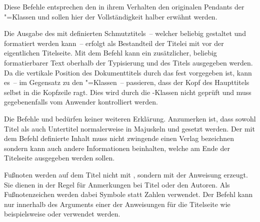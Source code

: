 \begin{Declaration}{}
\begin{Declaration}{}
\begin{Declaration}{}
\begin{Declaration}{}
\begin{Declaration}{}
\begin{Declaration}{}
\begin{Declaration}{}
\begin{Declaration}{}
\begin{Declaration}{}
\printdeclarationlist%
%
%
Diese Befehle entsprechen den in ihrem Verhalten den originalen Pendants der 
\KOMAScript"=Klassen{} und sollen hier der Vollständigkeit halber erwähnt 
werden.

Die Ausgabe des mit  definierten Schmutztitels~-- welcher 
beliebig gestaltet und formatiert werden kann~-- erfolgt als Bestandteil der 
Titelei mit  vor der eigentlichen Titelseite. Mit dem Befehl 
 kann ein zusätzlicher, beliebig formatierbarer Text oberhalb 
der Typisierung und des Titels ausgegeben werden. Da die vertikale Position des 
Dokumenttitels durch das \CD fest vorgegeben ist, kann es~-- im Gegensatz zu 
den \KOMAScript"=Klassen~-- passieren, dass der Kopf des Haupttitels selbst in 
die Kopfzeile ragt. Dies wird durch die \TUDScript-Klassen nicht geprüft und 
muss gegebenenfalls vom Anwender kontrolliert werden.

Die Befehle  und  bedürfen keiner weiteren 
Erklärung. Anzumerken ist, dass sowohl Titel als auch Untertitel normalerweise 
in Majuskeln und \DIN gesetzt werden. Der mit dem Befehl  
definierte Inhalt muss nicht zwingende einen Verlag bezeichnen sondern kann 
auch andere Informationen beinhalten, welche am Ende der Titelseite ausgegeben 
werden sollen.

Fußnoten werden auf dem Titel nicht mit , sondern mit der 
Anweisung  erzeugt. Sie dienen in der Regel für Anmerkungen bei 
Titel oder den Autoren. Als Fußnotenzeichen werden dabei Symbole statt Zahlen 
verwendet. Der Befehl  kann nur innerhalb des Arguments einer 
der Anweisungen für die Titelseite wie beispielsweise  oder 
 verwendet werden.


\end{Declaration}
\end{Declaration}
\end{Declaration}
\end{Declaration}
\end{Declaration}
\end{Declaration}
\end{Declaration}
\end{Declaration}
\end{Declaration}
